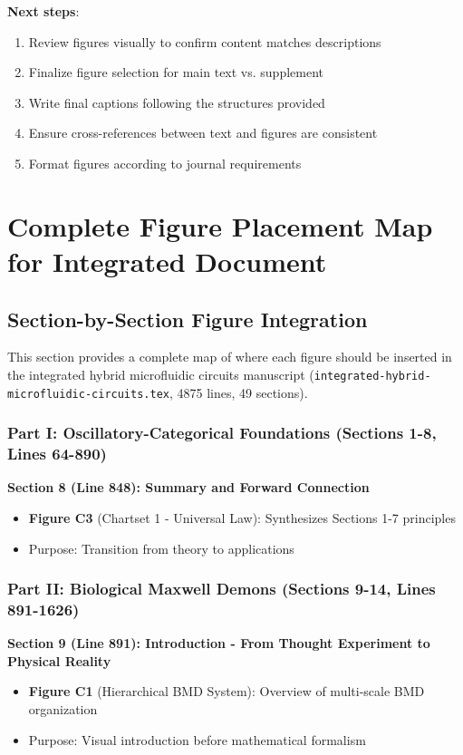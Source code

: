 \documentclass[11pt]{article}
\begin{document}
\textbf{Next steps}:
\begin{enumerate}
\item Review figures visually to confirm content matches descriptions
\item Finalize figure selection for main text vs. supplement
\item Write final captions following the structures provided
\item Ensure cross-references between text and figures are consistent
\item Format figures according to journal requirements
\end{enumerate}

\newpage

\section{Complete Figure Placement Map for Integrated Document}

\subsection{Section-by-Section Figure Integration}

This section provides a complete map of where each figure should be inserted in the integrated hybrid microfluidic circuits manuscript (\texttt{integrated-hybrid-microfluidic-circuits.tex}, 4875 lines, 49 sections).

\subsubsection{Part I: Oscillatory-Categorical Foundations (Sections 1-8, Lines 64-890)}

\textbf{Section 8 (Line 848): Summary and Forward Connection}
\begin{itemize}
\item \textbf{Figure C3} (Chartset 1 - Universal Law): Synthesizes Sections 1-7 principles
\item Purpose: Transition from theory to applications
\end{itemize}

\subsubsection{Part II: Biological Maxwell Demons (Sections 9-14, Lines 891-1626)}

\textbf{Section 9 (Line 891): Introduction - From Thought Experiment to Physical Reality}
\begin{itemize}
\item \textbf{Figure C1} (Hierarchical BMD System): Overview of multi-scale BMD organization
\item Purpose: Visual introduction before mathematical formalism
\end{itemize}
\end{document}
